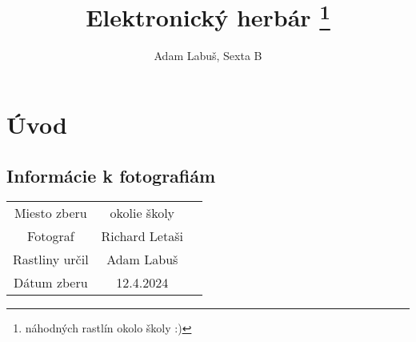 \documentclass[11pt]{extarticle}
\title{%
	{\Huge Elektronický herbár}
	\footnote{náhodných rastlín okolo školy :)}
}
\author{Adam Labuš, Sexta B}
\begin{document}
	\maketitle

	\section{Úvod}
	\subsection{Informácie k fotografiám}
	\begin{center}
		\begin{tabular}{ |c|c|c| }
		\hline
		Miesto zberu & okolie školy \\
		Fotograf & Richard Letaši \\
		Rastliny určil & Adam Labuš \\
		Dátum zberu & 12.4.2024 \\
		\hline
		\end{tabular}
	\end{center}

	\newpage
\end{document}
